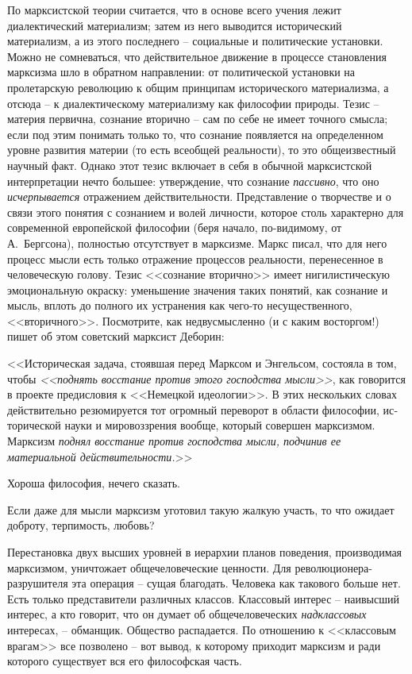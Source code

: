 \documentclass{book}
\begin{document}
По марксистской теории считается, что в основе всего учения лежит диалектический материализм; затем из него выводится 
исторический материализм, а из этого последнего -- социальные и политические установки. Можно не сомневаться, что действительное 
движение в процессе становления марксизма шло в обратном направлении: от политической установки на пролетарскую революцию к 
общим принципам исторического материа­лизма, а отсюда -- к диалектическому материализму как фило­софии природы. Тезис -- материя 
первична, сознание вторично -- сам по себе не имеет точного смысла; если под этим понимать только то, что сознание появляется на 
определенном уровне развития материи (то есть всеобщей реальности), то это общеизвестный научный факт. Однако этот тезис 
включает в себя в обычной марксистской интерпретации нечто большее: утверждение, что сознание \textit{пассивно},  что оно 
\textit{исчерпывается} отражением действительности. Представление о творчестве и о связи этого понятия с сознанием и волей 
личности, которое столь характерно для современной европейской философии (беря начало, по-видимому, от А.~Бергсона), полностью 
отсутствует в марксизме. Маркс писал, что для него процесс мысли есть только отражение процессов реальности, перенесенное в 
человеческую голову. Тезис <<сознание вторично>> имеет нигилистическую эмоциональную окраску: уменьшение значения таких понятий, 
как сознание и мысль, вплоть до полного их устранения как чего-то несущественного, <<вторичного>>. Посмотрите, как недвусмысленно (и с каким восторгом!) пишет об этом советский марксист Деборин:

<<Историческая задача, стоявшая перед Марксом и Энгельсом, состояла в том, чтобы \textit{<<поднять восстание против этого 
господства мысли>>},  как говорится в проекте предисловия к <<Немецкой идеологии>>. В этих нескольких словах действительно 
резюмируется тот огромный переворот в области философии, ис­торической науки и мировоззрения вообще, который совершен марксизмом. 
Марксизм \textit{поднял восстание против господства мысли, подчинив ее материальной действительности.}>>%

Хороша философия, нечего сказать.

Если даже для мысли марксизм уготовил такую жалкую участь, то что ожидает доброту, терпимость, любовь?

Перестановка двух высших уровней в иерархии планов поведения, производимая марксизмом, уничтожает общечеловеческие ценности. Для 
революционера-разрушителя эта операция -- сущая благодать. Человека как такового больше нет. Есть только представители различных 
классов. Классовый интерес -- наивысший интерес, а кто говорит, что он думает об общечеловеческих \textit{надклассовых}  
интересах, -- обманщик. Общество распадается. По отношению к <<классовым врагам>> все позволено -- вот вывод, к которому 
приходит марксизм и ради которого существует вся его философская часть.
\end{document}
